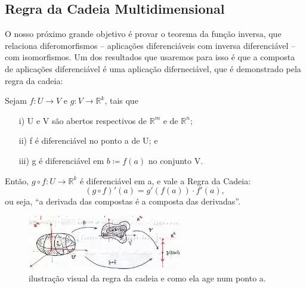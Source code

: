 \documentclass[../analysisII_notes.tex]{subfiles}
\begin{document}
\subsection{Regra da Cadeia Multidimensional}
O nosso próximo grande objetivo é provar o teorema da função inversa, que relaciona diferomorfismos -- aplicações diferenciáveis com inversa diferenciável -- com isomorfismos. Um dos resultados que usaremos para isso é que a composta de aplicações diferenciável é uma aplicação diferneciável, que é demonstrado pela regra da cadeia:
\hypertarget{multivariate_chain}{
	\begin{theorem*}
		Sejam \(f:U\rightarrow V\) e \(g:V\rightarrow \mathbb{R}^{k}\), tais que
		\begin{itemize}
			\item[i)] U e V são abertos respectivos de \(\mathbb{R}^{m}\) e de \(\mathbb{R}^{n}\);
			\item[ii)] f é diferenciável no ponto a de U; e
			\item[iii)] g é diferenciável em \(b\coloneqq f(a)\) no conjunto V.
		\end{itemize}
		Então, \(g\circ f:U\rightarrow \mathbb{R}^{k}\) é diferenciável em a, e vale a Regra da Cadeia:
		\[
			(g\circ f)'(a) = g'(f(a))\cdot f'(a),
		\]
		ou seja, ``a derivada das compostas é a composta das derivadas''.
	\end{theorem*}
}
\begin{figure}[H]
	\begin{center}
		\includegraphics[height=0.6\textheight, width=0.6\textwidth, keepaspectratio]{./Images/chain_rule_24.png}
	\end{center}
	\caption{ilustração visual da regra da cadeia e como ela age num ponto a.}
\end{figure}
\end{document}
